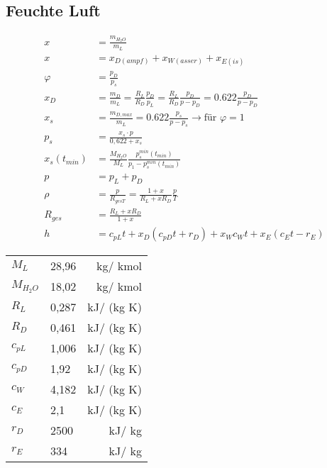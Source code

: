 \documentclass[twocolumn]{article}
\begin{document}
\pagebreak
\begin{multicols}{2}


%
                                                               
\section{Feuchte Luft}


\begin{align*}
	x &= \frac{m_{H_2O}}{m_L} \\
	x &= x_{D(ampf)} + x_{W(asser)} + x_{E(is)}  \\
	\varphi & = \frac{p_D}{p_s} \\
	x_D &= \frac{m_D}{m_L} = \frac{R_L}{R_D}\frac{p_D}{p_L} = \frac{R_L}{R_D} \frac{p_D}{p-p_D} = 0.622 \frac{p_D}{p-p_D} \\
	x_s &= \frac{m_{D,max}}{m_L} = 0.622 \frac{p_s}{p-p_s} \rightarrow \text{für $\varphi = 1$}\\
	p_s &= \frac{x_s \cdot p}{0,622 + x_s} \\
	x_s(t_{min}) &= \frac{M_{H_2O}}{M_L} \frac{p_s^{min}(t_{min})}{p_1 - p_s^{min}(t_{min})} \\
	p &= p_L + p_D \\
	\rho &= \frac{p}{R_{ges T}} = \frac{1 + x}{R_L + xR_D} \frac{p}{T} \\
	R_{ges} &= \frac{R_L + xR_D}{1+x} \\
	h &= c_{pL} t + x_D(c_{pD}t + r_D) + x_W c_W t + x_E (c_E t - r_E) 
\end{align*}
\begin{center}
	\begin{tabular}{l|R{13mm}|r}
 $M_L$& 28,96& kg/ kmol \\
 $M_{H_2O}$& 18,02& kg/ kmol \\
 $R_L$& 0,287& kJ/ (kg K) \\
 $R_D$& 0,461& kJ/ (kg K) \\
 $c_{pL}$& 1,006& kJ/ (kg K) \\
 $c_{pD}$& 1,92& kJ/ (kg K) \\
 $c_W$& 4,182& kJ/ (kg K) \\
 $c_E$& 2,1& kJ/ (kg K) \\
 $r_D$& 2500& kJ/ kg \\
 $r_E$& 334& kJ/ kg \\
\end{tabular}
\end{center}


\end{multicols}
\end{document}
